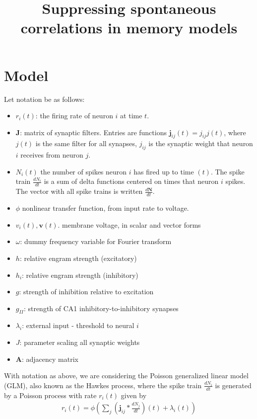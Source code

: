 \documentclass [12pt]{amsart}
\title{Suppressing spontaneous correlations in memory models}
\newcommand{\matr}[1]{\mathbf{#1}} %
\renewcommand{\vec}[1]{\mathbf{#1}} %
\theoremstyle{definition}
\begin{document}
\maketitle

\section{Model}
Let notation be as follows: 

\begin{itemize}
\item $r_i(t)$: the firing rate of neuron $i$ at time $t$. 
\item $\matr J$: matrix of synaptic filters. Entries are functions $\vec j_{ij}(t)= j_{ij} j(t) $, where $j(t)$ is the same filter for all synapses, $j_{ij}$ is the synaptic weight that neuron $i$ receives from neuron $j$. 
\item $N_i(t)$ the number of spikes neuron $i$ has fired up to time $(t)$. The spike train $\frac{dN_i}{dt}$ is a sum of delta functions centered on times that neuron $i$ spikes. The vector with all spike trains is written $\frac{d\vec N}{dt}$. 
\item $\phi$ nonlinear transfer function, from input rate to voltage. 
\item $v_i(t), \vec v(t)$. membrane voltage, in scalar and vector forms
\item $\omega$: dummy frequency variable for Fourier transform 
\item $h$: relative engram strength (excitatory)
\item $h_i$: relative engram strength (inhibitory)
\item $g$: strength of inhibition relative to excitation 
\item $g_{II}$: strength of CA1 inhibitory-to-inhibitory synapses
\item $\lambda_i$: external input - threshold to neural $i$
\item $J$: parameter scaling all synaptic weights 
\item $\matr A$: adjacency matrix 
\end{itemize}

With notation as above, we are considering the Poisson generalized linear model (GLM), also known as the Hawkes process, where the spike train $\frac{dN_i}{dt}$ is generated by a Poisson process with rate $r_i(t)$ given by
\begin{align}
r_i(t) = \phi\left(\sum_{j} \left(\vec j_{ij} * \frac{dN_j}{dt}\right)(t) + \lambda_i(t)\right)
\label{eqn:poisson_rate}
\end{align}
\end{document}
